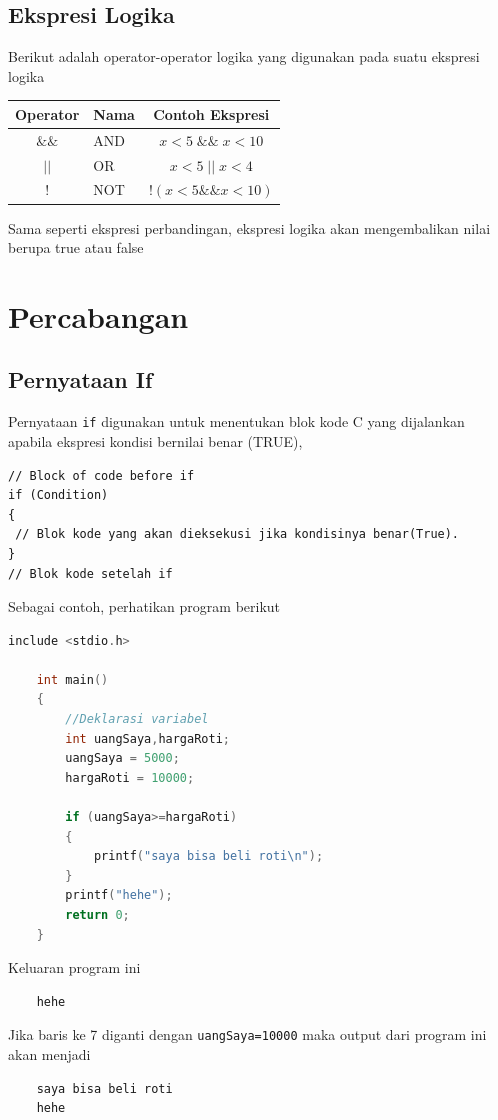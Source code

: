 \subsection{Ekspresi Logika}
Berikut adalah operator-operator logika yang digunakan pada suatu ekspresi logika
\begin{center}
	\begin{tabular}{|c|l|c|}
		\hline
		Operator & \multicolumn{1}{c|}{Nama} & Contoh Ekspresi        \\ \hline
		$\&\&$   & AND                       & $x<5\; \&\& \;x<10$    \\ \hline
		$||$     & OR                        & $x < 5\; ||\; x < 4  $ \\ \hline
		$!$      & NOT                       & $!(x <5 \&\& x < 10) $ \\ \hline
	\end{tabular}
\end{center}
Sama seperti ekspresi perbandingan, ekspresi logika akan mengembalikan nilai berupa true atau false

\section{Percabangan}
\subsection{Pernyataan If}
Pernyataan \verb*|if| digunakan untuk menentukan blok kode C yang dijalankan apabila ekspresi kondisi bernilai benar (TRUE),
\begin{verbatim}
// Block of code before if
if (Condition) 
{
 // Blok kode yang akan dieksekusi jika kondisinya benar(True).
}
// Blok kode setelah if
\end{verbatim}
Sebagai contoh, perhatikan program berikut
\begin{lstlisting}[language=c,caption =Contoh Pernyataan If,label=lst:ifexample01]
	include <stdio.h>
	
	int main()
	{
		//Deklarasi variabel 
		int uangSaya,hargaRoti;
		uangSaya = 5000;
		hargaRoti = 10000;
		
		if (uangSaya>=hargaRoti)
		{
		    printf("saya bisa beli roti\n");
		}
		printf("hehe");
		return 0;
	}
\end{lstlisting}
Keluaran program ini
\begin{verbatim}
    hehe
\end{verbatim}
Jika baris ke 7 diganti dengan \verb|uangSaya=10000| maka output dari program ini akan menjadi
\begin{verbatim}
    saya bisa beli roti
    hehe
\end{verbatim}


